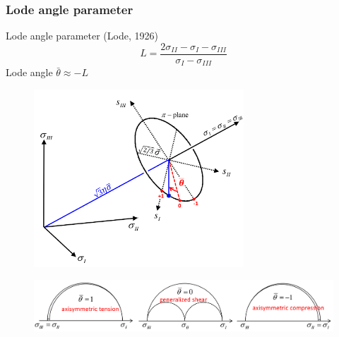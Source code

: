\documentclass[notes]{beamer}
\begin{document}
\begin{frame}
\frametitle{Lode angle parameter}
\noindent
\fboxsep=0pt
\noindent
\begin{minipage}[t]{0.3\linewidth}
Lode angle parameter (Lode, 1926)
\begin{equation*}
 L = \frac{2\sigma_{II} - \sigma_I - \sigma_{III}}{\sigma_I - \sigma_{III}}
\end{equation*}
Lode angle $\bar{\theta} \approx -L$
\end{minipage}%
\hfill
\begin{minipage}[t]{0.69\linewidth}
\begin{figure}
    \includegraphics[width=0.7\textwidth]{figs/lode-angle.png}
\end{figure}
\end{minipage}
\begin{figure}
    \includegraphics[width=\textwidth]{figs/lode-angle-tests.png}
\end{figure}
\end{frame}
\end{document}
